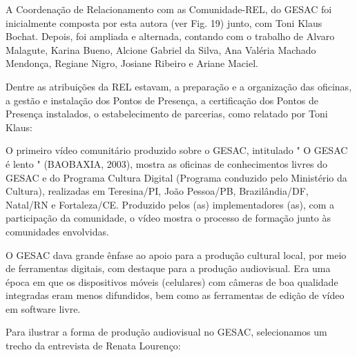 A Coordenação de Relacionamento com as Comunidade-REL, do GESAC foi inicialmente composta por esta autora (ver Fig. 19) junto, com Toni Klaus Bochat. Depois, foi ampliada e alternada, contando com o trabalho de Alvaro Malagute, Karina Bueno, Alcione Gabriel da Silva, Ana Valéria Machado Mendonça, Regiane Nigro, Josiane Ribeiro e Ariane Maciel.

Dentre as atribuições da REL estavam,  a preparação e a organização das oficinas, a gestão e instalação dos Pontos de Presença, a certificação dos Pontos de Presença instalados, o estabelecimento de parcerias, como relatado por Toni Klaus:


\noindent\begin{flushright}\mbox{\linespread{1}\selectfont\centering{}}\end{flushright}


O primeiro vídeo comunitário produzido sobre o GESAC, intitulado " O GESAC é lento "  (BAOBAXIA, 2003),  mostra as oficinas de conhecimentos livres do GESAC e do Programa Cultura Digital (Programa conduzido pelo Ministério da Cultura), realizadas em Teresina/PI, João Pessoa/PB, Brazilândia/DF, Natal/RN e Fortaleza/CE. Produzido pelos (as) implementadores (as), com a participação da comunidade, o vídeo mostra o processo de formação junto às comunidades envolvidas.

O GESAC dava grande ênfase ao apoio para a produção cultural local, por meio de ferramentas digitais, com destaque para a produção audiovisual. Era uma época em que os dispositivos móveis (celulares) com câmeras de boa qualidade integradas eram menos difundidos, bem como as ferramentas de edição de vídeo em software livre.

Para ilustrar a forma de produção audiovisual no GESAC, selecionamos um trecho da entrevista de Renata Lourenço:


\noindent\begin{flushright}\mbox{\linespread{1}\selectfont\centering{}}\end{flushright}


